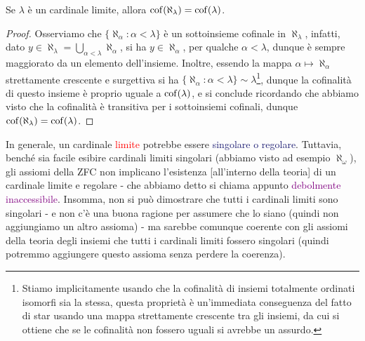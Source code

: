 \begin{proposition}
	Se $\lambda$ \`e un cardinale limite, allora $\operatorname{cof}(\aleph_\lambda) = \operatorname{cof}(\lambda)$.
\end{proposition}

\begin{proof}
	Osserviamo che $\{\aleph_\alpha : \alpha < \lambda\}$ \`e un sottoinsieme cofinale in $\aleph_\lambda$, infatti, dato $y \in \aleph_\lambda = \bigcup_{\alpha < \lambda} \aleph_\alpha$, si ha $y \in \aleph_\alpha$, per qualche $\alpha < \lambda$, dunque \`e sempre maggiorato da un elemento dell'insieme.
	Inoltre, essendo la mappa $\alpha \mapsto \aleph_\alpha$ strettamente crescente e surgettiva si ha $\{\aleph_\alpha : \alpha < \lambda\} \sim \lambda$\footnote{Stiamo implicitamente usando che la cofinalit\`a di insiemi totalmente ordinati isomorfi sia la stessa, questa propriet\`a \`e un'immediata conseguenza del fatto di star usando una mappa 
	strettamente crescente tra gli insiemi, da cui si ottiene che se le cofinalit\`a non fossero uguali si avrebbe un assurdo.}, dunque la cofinalit\`a di questo insieme \`e proprio uguale a $\operatorname{cof}(\lambda)$, e si conclude ricordando che abbiamo visto che la cofinalit\`a \`e transitiva per i sottoinsiemi cofinali, dunque $\operatorname{cof}(\aleph_\lambda) = \operatorname{cof}(\lambda)$.
\end{proof}
\pagebreak
\begin{note}
	In generale, un cardinale \textcolor{red}{limite} potrebbe essere \textcolor{MidnightBlue}{singolare o regolare}. Tuttavia, bench\'e sia facile esibire cardinali limiti singolari (abbiamo visto ad esempio $\aleph_\omega$), gli assiomi della ZFC non implicano l'esistenza [all'interno della teoria]
	di un cardinale limite e regolare - che abbiamo detto si chiama appunto \textcolor{purple}{debolmente inaccessibile}. Insomma, non si pu\`o dimostrare che tutti i cardinali limiti sono singolari - e non c'\`e una buona ragione per assumere che lo siano (quindi non aggiungiamo un altro assioma) - ma sarebbe comunque coerente
	con gli assiomi della teoria degli insiemi che tutti i cardinali limiti fossero singolari (quindi potremmo aggiungere questo assioma senza perdere la coerenza).
\end{note}

